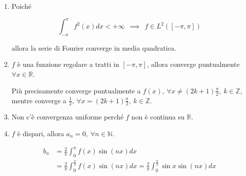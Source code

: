\begin{enumerate}
\begin{figure}[htpb]
\end{figure}
\FloatBarrier

\item Poiché

\begin{equation*}
\int ^{\pi }_{-\pi } f^{2}( x) dx< +\infty \ \ \implies \ \ f\in L^{2}([ -\pi ,\pi ])
\end{equation*}

allora la serie di Fourier converge in media quadratica.
\item $f$ è una funzione regolare a tratti in $[ -\pi ,\pi ]$, allora converge puntualmente $\forall x\in \mathbb{R}$.

Più precisamente converge puntualmente a $f( x) ,\ \forall x\neq ( 2k+1)\frac{\pi }{2} ,\ k\in \mathbb{Z}$, mentre converge a $\frac{1}{2} ,\ \forall x=( 2k+1)\frac{\pi }{2} ,\ k\in \mathbb{Z}$.
\item Non c'è convergenza uniforme perché $f$ non è continua su $\mathbb{R}$.
\item $f$ è dispari, allora $a_{n} =0,\ \forall n\in \mathbb{N}$.

\begin{equation*}
\begin{aligned}
b_{n} & =\frac{2}{\pi }\int ^{\pi }_{0} f( x)\sin( nx) dx\\
 & =\frac{2}{\pi }\int ^{\frac{\pi }{2}}_{0} f( x)\sin( nx) dx=\frac{2}{\pi }\int ^{\frac{\pi }{2}}_{0}\sin x\sin( nx) dx
\end{aligned}
\end{equation*}


\end{enumerate}
